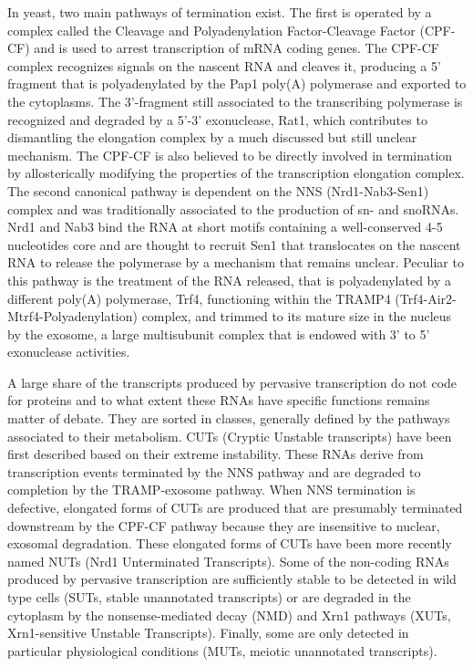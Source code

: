 In yeast, two main pathways of termination exist. The first is operated by a complex called the Cleavage and Polyadenylation Factor-Cleavage Factor (CPF-CF) and is used to arrest transcription of mRNA coding genes. The CPF-CF complex recognizes signals on the nascent RNA and cleaves it, producing a 5’ fragment that is polyadenylated by the Pap1 poly(A) polymerase and exported to the cytoplasms.  The 3’-fragment still associated to the transcribing polymerase is recognized and degraded by a 5’-3’ exonuclease,  Rat1, which contributes to dismantling the elongation complex by a much discussed but still unclear mechanism. The CPF-CF is also believed to be directly involved in termination by allosterically modifying the properties of the transcription elongation complex. 
The second canonical pathway is dependent on the NNS (Nrd1-Nab3-Sen1) complex and was traditionally associated to the production of sn- and snoRNAs. Nrd1 and Nab3 bind the RNA at short motifs containing a well-conserved 4-5 nucleotides core and are thought to recruit Sen1 that translocates on the nascent RNA to release the polymerase by a mechanism that remains unclear. Peculiar to this pathway is the treatment of the RNA released, that is polyadenylated by a different poly(A) polymerase, Trf4, functioning within the TRAMP4 (Trf4-Air2-Mtrf4-Polyadenylation) complex, and trimmed to its mature size in the nucleus by the exosome, a large multisubunit complex that is endowed with 3’ to 5’ exonuclease activities. 

A large share of the transcripts produced by pervasive transcription do not code for proteins and to what extent these RNAs have specific functions remains matter of debate. They are sorted in classes, generally defined by the pathways associated to their metabolism. CUTs (Cryptic Unstable transcripts) have been first described based on their extreme instability. These RNAs derive from transcription events terminated by the NNS pathway and are degraded to completion by the TRAMP-exosome pathway. When NNS termination is defective, elongated forms of CUTs are produced that are presumably terminated downstream by the CPF-CF pathway because they are insensitive to nuclear, exosomal degradation. These elongated forms of CUTs have been more recently named NUTs (Nrd1 Unterminated Transcripts).  Some of the non-coding RNAs produced by pervasive transcription are sufficiently stable to be detected in wild type cells (SUTs, stable unannotated transcripts) or are degraded in the cytoplasm by the nonsense-mediated decay (NMD) and Xrn1 pathways (XUTs, Xrn1-sensitive Unstable Transcripts). Finally, some are only detected in particular physiological conditions (MUTs,  meiotic unannotated transcripts). 


